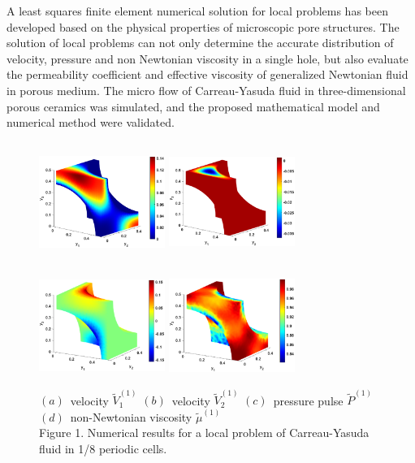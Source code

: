\documentclass[12pt]{llncs}
\begin{document}
A least squares finite element numerical solution for local problems has been developed based on the physical properties of microscopic pore structures.
The solution of local problems can not only determine the accurate distribution of velocity, pressure and non Newtonian viscosity in a single hole, but also evaluate the permeability coefficient and effective viscosity of generalized Newtonian fluid in porous medium.
The micro flow of Carreau-Yasuda fluid in three-dimensional porous ceramics was simulated, and the proposed mathematical model and numerical method were validated.
\begin{figure}[htp]
\centering
\includegraphics[width=4.1cm,height=3.9cm]{1_1.eps}
\includegraphics[width=4.1cm,height=3.9cm]{1_2.eps}
\includegraphics[width=4.1cm,height=3.9cm]{1_3.eps}
\includegraphics[width=4.1cm,height=3.9cm]{1_4.eps}\\
$(a)$\ velocity $\tilde{V}_{1}^{(1)}$\quad
$(b)$\ velocity $\tilde{V}_{2}^{(1)}$\quad
$(c)$\ pressure pulse $\tilde{P}^{(1)}$\quad
$(d)$\ non-Newtonian viscosity $\tilde{\mu}^{(1)}$\\
\small{Figure 1. Numerical results for a local problem of Carreau-Yasuda fluid in 1/8 periodic cells.}
\end{figure}
\end{document}
